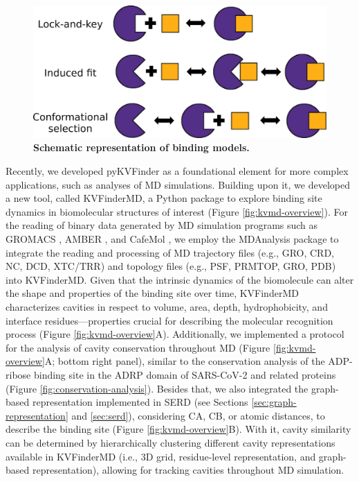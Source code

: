 \documentclass[Ingles]{phdthesis}
\def\ie{i.e.\onedot}
\def\eg{e.g.\onedot}
\begin{document}
\begin{figure}[h]
  \centering
  \includegraphics[scale=0.3]{images/molecular-recognition.png}
  \caption[Schematic representation of binding models]{\textbf{Schematic representation of binding models.}}
  \label{fig:molecular-recognition}
\end{figure}

Recently, we developed pyKVFinder \cite{guerra2021} as a foundational element for more complex applications, such as analyses of MD simulations. Building upon it, we developed a new tool, called \ac{KVFinderMD}, a Python package to explore binding site dynamics in biomolecular structures of interest (Figure \ref{fig:kvmd-overview}). For the reading of binary data generated by \acs{MD} simulation programs such as GROMACS \cite{gromacs}, AMBER \cite{amber}, and CafeMol \cite{kenzaki2011}, we employ the MDAnalysis package \cite{mdanalysis} to integrate the reading and processing of \acs{MD} trajectory files (\eg, GRO, CRD, NC, DCD, XTC/TRR) and topology files (\eg, PSF, PRMTOP, GRO, PDB) into KVFinderMD. Given that the intrinsic dynamics of the biomolecule can alter the shape and properties of the binding site over time, KVFinderMD characterizes cavities in respect to volume, area, depth, hydrophobicity, and interface residues---properties crucial for describing the molecular recognition process (Figure \ref{fig:kvmd-overview}A). Additionally, we implemented a protocol for the analysis of cavity conservation throughout MD (Figure \ref{fig:kvmd-overview}A; bottom right panel), similar to the conservation analysis of the ADP-ribose binding site in the \acs{ADRP} domain of \acs{SARS-CoV-2} and related proteins (Figure \ref{fig:conservation-analysis}). Besides that, we also integrated the graph-based representation implemented in SERD (see Sections \ref{sec:graph-representation} and \ref{sec:serd}), considering \acs{CA}, \acs{CB}, or atomic distances, to describe the binding site (Figure \ref{fig:kvmd-overview}B). With it, cavity similarity can be determined by hierarchically clustering different cavity representations available in KVFinderMD (\ie, 3D grid, residue-level representation, and graph-based representation), allowing for tracking cavities throughout \acs{MD} simulation.
\end{document}
